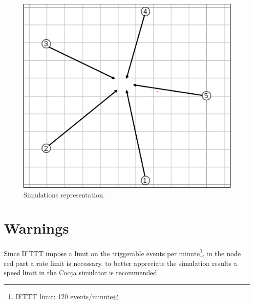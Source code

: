\documentclass{article}
\begin{document}
\begin{figure}[h]
\begin{minipage}[c]{.3\linewidth}
    \end{minipage}\hspace{10pt}
    \begin{minipage}[c]{.3\linewidth}
        \centering
        \includegraphics[cfbox=black 1pt 1pt,scale=0.21]{./simulation1.png}
    \end{minipage}
    \caption{Simulations representation.}
    \label{fig:simulationFIG}
\end{figure}

\section{Warnings}
Since IFTTT impose a limit on the triggerable events per minute\footnote{IFTTT limit: 120 events/minute}, in the node red part a rate limit is necessary. to better appreciate the simulation results a speed limit in the Cooja simulator is recommended



\pagebreak
\pagebreak
\clearpage
\end{document}
